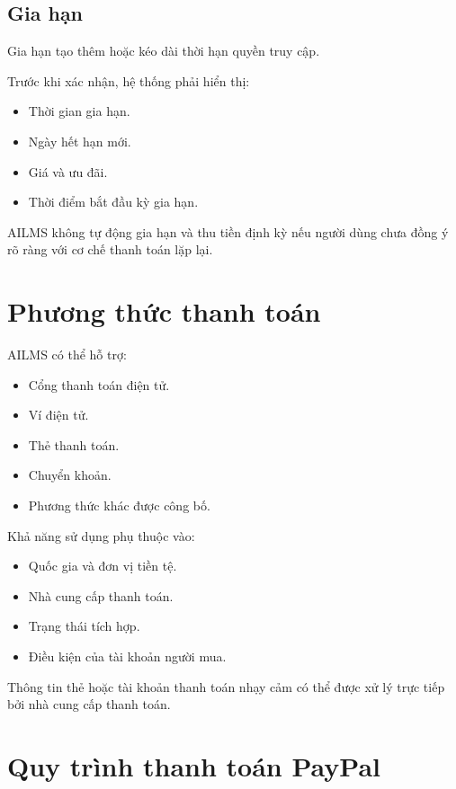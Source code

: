 \documentclass[12pt,a4paper]{article}
\begin{document}
\subsection{Gia hạn}

Gia hạn tạo thêm hoặc kéo dài thời hạn quyền truy cập.

Trước khi xác nhận, hệ thống phải hiển thị:

\begin{itemize}
    \item Thời gian gia hạn.
    \item Ngày hết hạn mới.
    \item Giá và ưu đãi.
    \item Thời điểm bắt đầu kỳ gia hạn.
\end{itemize}

AILMS không tự động gia hạn và thu tiền định kỳ
nếu người dùng chưa đồng ý rõ ràng với cơ chế thanh toán lặp lại.

\section{Phương thức thanh toán}

AILMS có thể hỗ trợ:

\begin{itemize}
    \item Cổng thanh toán điện tử.
    \item Ví điện tử.
    \item Thẻ thanh toán.
    \item Chuyển khoản.
    \item Phương thức khác được công bố.
\end{itemize}

Khả năng sử dụng phụ thuộc vào:

\begin{itemize}
    \item Quốc gia và đơn vị tiền tệ.
    \item Nhà cung cấp thanh toán.
    \item Trạng thái tích hợp.
    \item Điều kiện của tài khoản người mua.
\end{itemize}

Thông tin thẻ hoặc tài khoản thanh toán nhạy cảm
có thể được xử lý trực tiếp bởi nhà cung cấp thanh toán.

\section{Quy trình thanh toán PayPal}
\end{document}
